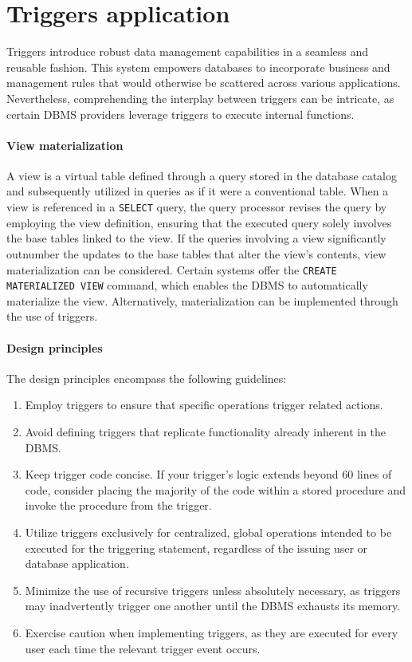\section{Triggers application}

Triggers introduce robust data management capabilities in a seamless and reusable fashion. 
This system empowers databases to incorporate business and management rules that would otherwise be scattered across various applications. 
Nevertheless, comprehending the interplay between triggers can be intricate, as certain DBMS  providers leverage triggers to execute internal functions.

\paragraph*{View materialization}
A view is a virtual table defined through a query stored in the database catalog and subsequently utilized in queries as if it were a conventional table. 
When a view is referenced in a \texttt{SELECT} query, the query processor revises the query by employing the view definition, ensuring that the executed query solely involves the base tables linked to the view.   
If the queries involving a view significantly outnumber the updates to the base tables that alter the view's contents, view materialization can be considered.  
Certain systems offer the \texttt{CREATE MATERIALIZED VIEW} command, which enables the DBMS to automatically materialize the view. 
Alternatively, materialization can be implemented through the use of triggers.

\paragraph*{Design principles}
The design principles encompass the following guidelines:
\begin{enumerate}
    \item Employ triggers to ensure that specific operations trigger related actions.
    \item Avoid defining triggers that replicate functionality already inherent in the DBMS. 
    \item Keep trigger code concise. 
        If your trigger's logic extends beyond 60 lines of code, consider placing the majority of the code within a stored procedure and invoke the procedure from the trigger.
    \item Utilize triggers exclusively for centralized, global operations intended to be executed for the triggering statement, regardless of the issuing user or database application.
    \item Minimize the use of recursive triggers unless absolutely necessary, as triggers may inadvertently trigger one another until the DBMS exhausts its memory.
    \item Exercise caution when implementing triggers, as they are executed for every user each time the relevant trigger event occurs.
\end{enumerate}